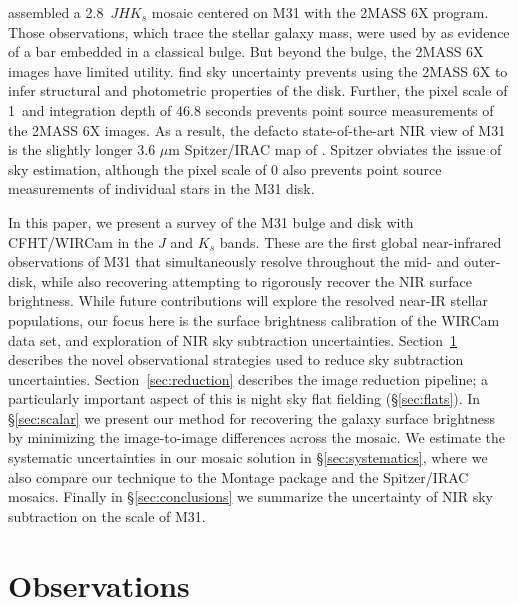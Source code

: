 \documentclass[iop]{emulateapj}
\begin{document}
\cite{Beaton:2007} assembled a 2.8\arcdeg\ $JHK_s$ mosaic centered on M31 with the 2MASS 6X program.
Those observations, which trace the stellar galaxy mass, were used by \cite{Athanassoula:2006} as evidence of a bar embedded in a classical bulge.
But beyond the bulge, the 2MASS 6X images have limited utility.
\cite{Courteau:2011} find sky uncertainty prevents using the 2MASS 6X to infer structural and photometric properties of the disk.
Further, the pixel scale of 1\arcsec\ and integration depth of 46.8 seconds prevents point source measurements of the 2MASS 6X images.
As a result, the defacto state-of-the-art NIR view of M31 is the slightly longer 3.6 $\mu$m Spitzer/IRAC map of \cite{Barmby:2006}.
Spitzer obviates the issue of sky estimation, although the pixel scale of 0 also prevents point source measurements of individual stars in the M31 disk.

In this paper, we present a survey of the M31 bulge and disk with CFHT/WIRCam in the $J$ and $K_s$ bands.
These are the first global near-infrared observations of M31 that simultaneously resolve throughout the mid- and outer-disk, while also recovering attempting to rigorously recover the NIR surface brightness.
While future contributions will explore the resolved near-IR stellar populations, our focus here is the surface brightness calibration of the WIRCam data set, and exploration of NIR sky subtraction uncertainties.
Section~\ref{sec:Observations} describes the novel observational strategies used to reduce sky subtraction uncertainties.
Section~\ref{sec:reduction} describes the image reduction pipeline; a particularly important aspect of this is night sky flat fielding (\S\ref{sec:flats}).
In \S\ref{sec:scalar} we present our method for recovering the galaxy surface brightness by minimizing the image-to-image differences across the mosaic.
We estimate the systematic uncertainties in our mosaic solution in \S\ref{sec:systematics}, where we also compare our technique to the Montage package \citep{Berriman:2008} and the Spitzer/IRAC mosaics.
Finally in \S\ref{sec:conclusions} we summarize the uncertainty of NIR sky subtraction on the scale of M31.

\section{Observations}
\label{sec:Observations}
\end{document}
